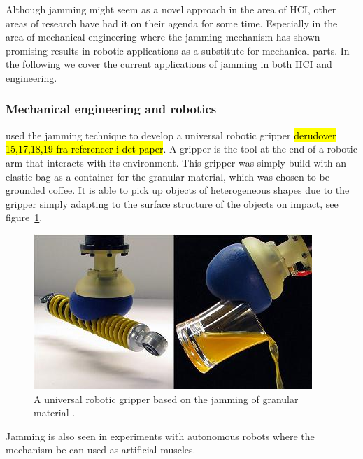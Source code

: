 Although jamming might seem as a novel approach in the area of HCI, other areas of research have had it on their agenda for some time. 
Especially in the area of mechanical engineering where the jamming mechanism has shown promising results in robotic applications as a substitute for mechanical parts.
In the following we cover the current applications of jamming in both HCI and engineering. 

\subsubsection{Mechanical engineering and robotics}

\citet{brown2010universal, amend2012positive} used the jamming technique to develop a universal robotic gripper \hl{derudover 15,17,18,19 fra referencer i det paper}. 
A gripper is the tool at the end of a robotic arm that interacts with its environment.
This gripper was simply build with an elastic bag as a container for the granular material, which was chosen to be grounded coffee. 
It is able to pick up objects of heterogeneous shapes due to the gripper simply adapting to the surface structure of the objects on impact, see figure~\ref{fig:ch:jamming:jamming-robot-gripper}. 

\begin{figure}[h]
  \centering
  \includegraphics[width=0.9\linewidth]{figures/jamming/jamming-robot-gripper}
	\caption[A universal robotic gripper based on the jamming of granular material by \citet{brown2010universal}.]
   {A universal robotic gripper based on the jamming of granular material \citep{brown2010universal}.}
   \label{fig:ch:jamming:jamming-robot-gripper}
\end{figure}

Jamming is also seen in experiments with autonomous robots where the mechanism be can used as artificial muscles.


